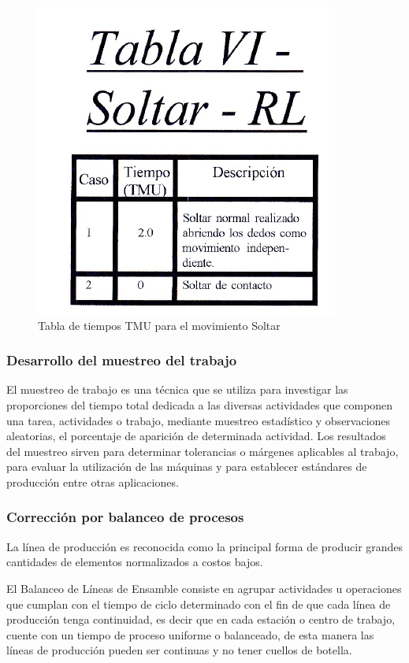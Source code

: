 \begin{figure}[H]
        \centering
        \includegraphics[trim = {0mm 0mm 0mm 0mm},clip,scale=0.2]{10/Img/tabla6.png}
        \caption{Tabla de tiempos TMU para el movimiento Soltar}
        \label{tabla6}
\end{figure}
%
%
\subsubsection{Desarrollo del muestreo del trabajo}

El muestreo de trabajo es una técnica que se utiliza para investigar las proporciones del tiempo total dedicada a las diversas actividades que componen una tarea, actividades o trabajo, mediante muestreo estadístico y observaciones aleatorias, el porcentaje de aparición de determinada actividad. Los resultados del muestreo sirven para determinar tolerancias o márgenes aplicables al trabajo, para evaluar la utilización de las máquinas y para establecer estándares de producción entre otras aplicaciones. \cite{Muestreodetrabajo}
%
%
\subsubsection{Corrección por balanceo de procesos}

La línea de producción es reconocida como la principal forma de producir grandes cantidades de elementos normalizados a costos bajos.

El Balanceo de Líneas de Ensamble consiste en agrupar actividades u operaciones que cumplan con el tiempo de ciclo determinado con el fin de que cada línea de producción tenga continuidad, es decir que en cada estación o centro de trabajo, cuente con un tiempo de proceso uniforme o balanceado, de esta manera las líneas de producción pueden ser continuas y no tener cuellos de botella.


